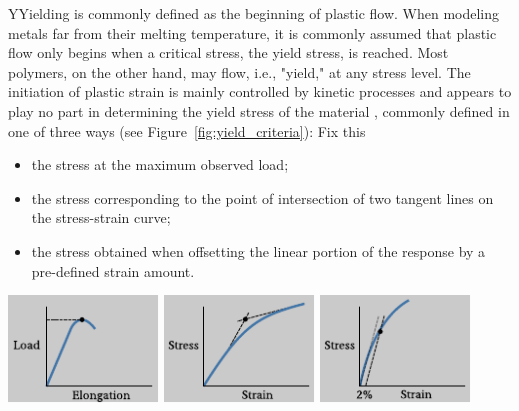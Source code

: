 \begin{remark}
YYielding is commonly defined as the beginning of plastic flow.
When modeling metals far from their melting temperature, it is commonly assumed that plastic flow only begins when a critical stress, the yield stress, is reached.
Most polymers, on the other hand, may flow, i.e., "yield," at any stress level.
The initiation of plastic strain is mainly controlled by kinetic processes and appears to play no part in determining the yield stress of the material \citep{fotheringhamRoleRecoveryForces1978}, commonly defined in one of three ways \citep{wardReviewYieldBehaviour1971} (see Figure~\ref{fig:yield_criteria}): \textcolor{BrickRed}{Fix this}
    \begin{itemize}
        \item the stress at the maximum observed load;
        \item the stress corresponding to the point of intersection of two tangent lines on the stress-strain curve;
        \item the stress obtained when offsetting the linear portion of the response by a pre-defined strain amount.
    \end{itemize}
    \begin{center}
            \centering
                                \includegraphics[width=0.3\textwidth]{figures/yield_criterion_a}
                \hfill
                            \includegraphics[width=0.3\textwidth]{figures/yield_criterion_b}
            \hfill
                                \includegraphics[width=0.3\textwidth]{figures/yield_criterion_c}
        \label{fig:yield_criteria}
    \end{center}
\label{rmrk:yield_polymer}
\end{remark}

